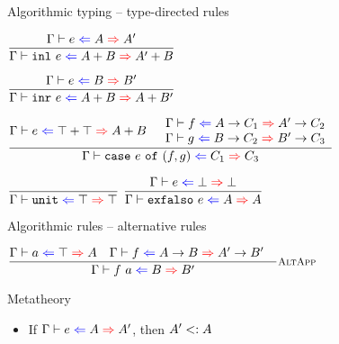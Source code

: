 \documentclass{beamer}
\begin{document}
\begin{frame}{Algorithmic typing -- type-directed rules}

\begin{center}
  $\infrule{\hinting{e}{A}{A'}}{\hinting{\inl{e}}{\Sum{A}{B}}{\Sum{A'}{B}}}$

  \vspace{2em}

  $\infrule{\hinting{e}{B}{B'}}{\hinting{\inr{e}}{\Sum{A}{B}}{\Sum{A}{B'}}}$

  \vspace{2em}

  $\infrule{\hinting{e}{\Sum{\Top}{\Top}}{\Sum{A}{B}} \quad \begin{array}{c} \hinting{f}{\Fun{A}{C_1}}{\Fun{A'}{C_2}} \\ \hinting{g}{\Fun{B}{C_2}}{\Fun{B'}{C_3}} \end{array}}{\hinting{\case{e}{f}{g}}{C_1}{C_3}}$

  \vspace{2em}

  $\infrule{}{\hinting{\unit}{\Top}{\Top}}$ \quad
  $\infrule{\hinting{e}{\Bot}{\Bot}}{\hinting{\exfalso{e}}{A}{A}}$
\end{center}

\end{frame}

\begin{frame}{Algorithmic rules -- alternative rules}

\begin{center}
  $\infrule[AltApp]{\hinting{a}{\Top}{A} \quad \hinting{f}{\Fun{A}{B}}{\Fun{A'}{B'}} \quad }{\hinting{\app{f}{a}}{B}{B'}}$
\end{center}

\end{frame}

\begin{frame}{Metatheory}

\begin{itemize}
  \item If $\hinting{e}{A}{A'}$, then $A' <: A$
\end{itemize}

\end{frame}
\end{document}
